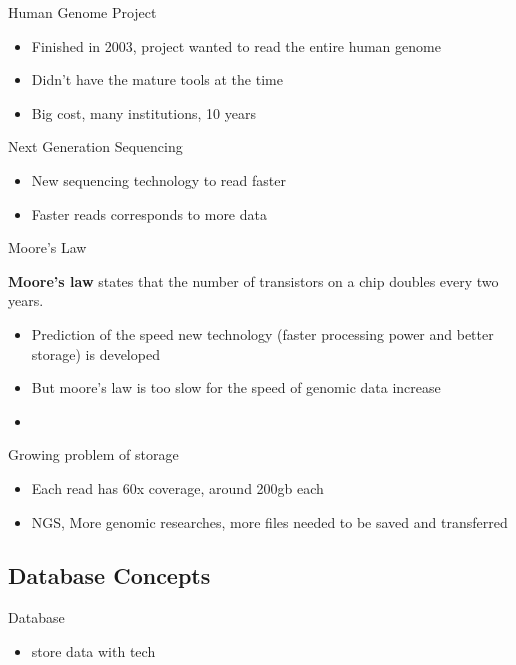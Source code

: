 \documentclass{beamer}
\begin{document}
\begin{frame}{Human Genome Project}
  \begin{itemize}   
    \item Finished in 2003, project wanted to read the entire human genome
    \item Didn't have the mature tools at the time
    \item Big cost, many institutions, 10 years \cite{introgenomics}
  \end{itemize}
\end{frame}

\begin{frame}{Next Generation Sequencing}
  \begin{itemize}   
    \item New sequencing technology to read faster
    \item Faster reads corresponds to more data
  \end{itemize}
\end{frame}

\begin{frame}{Moore's Law}
  \begin{block}{\textbf{Moore's law}} 
    states that the number of transistors on a chip doubles every two years.\cite{kurose}
  \end{block}
  \begin{itemize}   
    \item Prediction of the speed new technology (faster processing power and better storage) is developed
    \item But moore's law is too slow for the speed of genomic data increase
    \item
  \end{itemize}
\end{frame}

\begin{frame}{Growing problem of storage}
  \begin{itemize}   
    \item Each read\cite{seqtorr} has 60x coverage, around 200gb each
    \item NGS, More genomic researches, more files needed to be saved and transferred
  \end{itemize}
\end{frame}

\subsection{Database Concepts}
\begin{frame}{Database}
  \begin{itemize}   
    \item store data with tech
  \end{itemize}
\end{frame}
\end{document}
